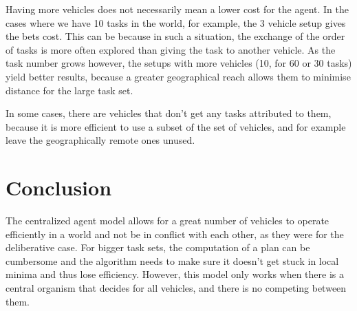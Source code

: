 \documentclass[12pt,a4paper]{article}
\begin{document}
Having more vehicles does not necessarily mean a lower cost for the agent. In the cases where we have 10 tasks in the world, for example, the 3 vehicle setup gives the bets cost. This can be because in such a situation, the exchange of the order of tasks is more often explored than giving the task to another vehicle. As the task number grows however, the setups with more vehicles (10, for 60 or 30 tasks) yield better results, because a greater geographical reach allows them to minimise distance for the large task set.

In some cases, there are vehicles that don't get any tasks attributed to them, because it is more efficient to use a subset of the set of vehicles, and for example leave the geographically remote ones unused.

\section{Conclusion}
The centralized agent model allows for a great number of vehicles to operate efficiently in a world and not be in conflict with each other, as they were for the deliberative case. For bigger task sets, the computation of a plan can be cumbersome and the algorithm needs to make sure it doesn't get stuck in local minima and thus lose efficiency. However, this model only works when there is a central organism that decides for all vehicles, and there is no competing between them.
\end{document}

